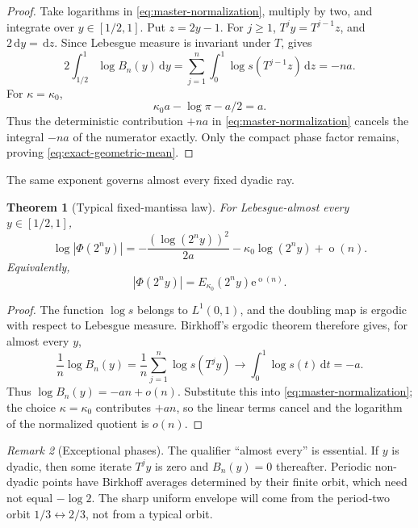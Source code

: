 \documentclass[11pt,oneside]{article}
\numberwithin{equation}{section}
\newtheorem{theorem}{Theorem}[section]
\theoremstyle{definition}
\theoremstyle{remark}
\newtheorem{remark}[theorem]{Remark}
\newcommand{\e}{\mathrm e}
\newcommand{\dd}{\,\mathrm d}
\newcommand{\abs}[1]{\left|#1\right|}
\newcommand{\littleo}{\mathop{o}}
\newcommand{\PhiUp}{\Phi}
\begin{document}
\begin{proof}
Take logarithms in \eqref{eq:master-normalization}, multiply by two, and integrate over
\(y\in[1/2,1]\).  Put \(z=2y-1\).  For \(j\ge1\),
\(T^jy=T^{j-1}z\), and \(2\dd y=\dd z\).  Since Lebesgue measure is invariant under
\(T\),  gives
\[
 2\int_{1/2}^{1}\log B_n(y)\dd y
 =\sum_{j=1}^{n}\int_0^1\log s(T^{j-1}z)\dd z=-na.
\]
For \(\kappa=\kappa_0\),
\[
 \kappa_0a-\log\pi-a/2=a.
\]
Thus the deterministic contribution \(+na\) in \eqref{eq:master-normalization} cancels the
integral \(-na\) of the numerator exactly.  Only the compact phase factor remains, proving
\eqref{eq:exact-geometric-mean}.
\end{proof}

The same exponent governs almost every fixed dyadic ray.

\begin{theorem}[Typical fixed-mantissa law]
\label{thm:typical-ray}
For Lebesgue-almost every \(y\in[1/2,1]\),
\begin{equation}
 \log\abs{\PhiUp(2^ny)}
 =-\frac{(\log(2^ny))^2}{2a}
  -\kappa_0\log(2^ny)+\littleo(n).
 \label{eq:typical-ray}
\end{equation}
Equivalently,
\begin{equation}
 \abs{\PhiUp(2^ny)}=E_{\kappa_0}(2^ny)\e^{\littleo(n)}.
 \label{eq:typical-ray-multiplicative}
\end{equation}
\end{theorem}

\begin{proof}
The function \(\log s\) belongs to \(L^1(0,1)\), and the doubling map is ergodic with
respect to Lebesgue measure.  Birkhoff's ergodic theorem therefore gives, for almost every
\(y\),
\[
 \frac1n\log B_n(y)
 =\frac1n\sum_{j=1}^{n}\log s(T^jy)
 \longrightarrow\int_0^1\log s(t)\dd t=-a.
\]
Thus \(\log B_n(y)=-an+o(n)\).  Substitute this into
\eqref{eq:master-normalization}; the choice \(\kappa=\kappa_0\) contributes \(+an\), so the
linear terms cancel and the logarithm of the normalized quotient is \(o(n)\).
\end{proof}

\begin{remark}[Exceptional phases]
The qualifier ``almost every'' is essential.  If \(y\) is dyadic, then some iterate
\(T^jy\) is zero and \(B_n(y)=0\) thereafter.  Periodic non-dyadic points have Birkhoff
averages determined by their finite orbit, which need not equal \(-\log2\).  The sharp
uniform envelope will come from the period-two orbit \(1/3\leftrightarrow2/3\), not from a
typical orbit.
\end{remark}
\end{document}
